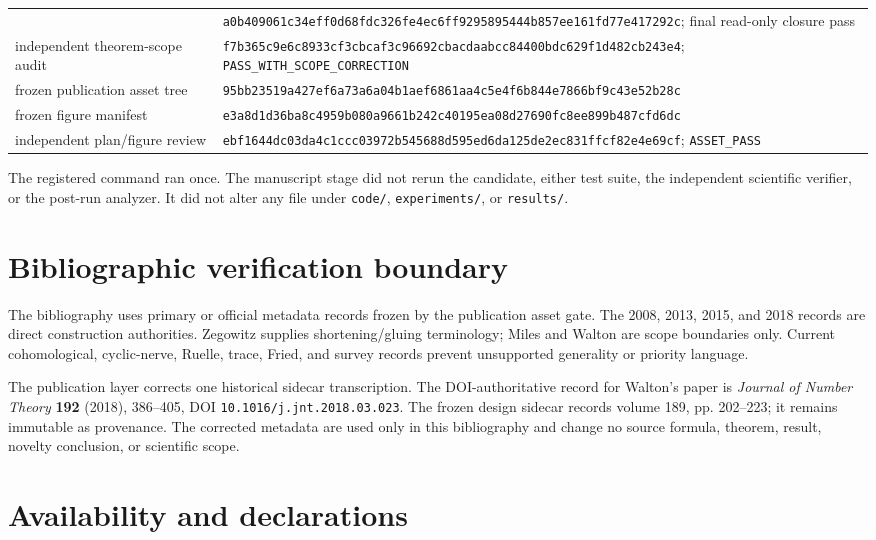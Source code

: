 \documentclass[11pt]{article}
\theoremstyle{definition}
\theoremstyle{remark}
\begin{document}
\begin{longtable}{@{}p{}p{}@{}}
    & \nolinkurl{a0b409061c34eff0d68fdc326fe4ec6ff9295895444b857ee161fd77e417292c};
      final read-only closure pass \\
  independent theorem-scope audit
    & \nolinkurl{f7b365c9e6c8933cf3cbcaf3c96692cbacdaabcc84400bdc629f1d482cb243e4};
      \texttt{PASS\_WITH\_SCOPE\_CORRECTION} \\
  frozen publication asset tree
    & \nolinkurl{95bb23519a427ef6a73a6a04b1aef6861aa4c5e4f6b844e7866bf9c43e52b28c} \\
  frozen figure manifest
    & \nolinkurl{e3a8d1d36ba8c4959b080a9661b242c40195ea08d27690fc8ee899b487cfd6dc} \\
  independent plan/figure review
    & \nolinkurl{ebf1644dc03da4c1ccc03972b545688d595ed6da125de2ec831ffcf82e4e69cf};
      \texttt{ASSET\_PASS} \\
  \bottomrule
\end{longtable}

The registered command ran once.  The manuscript stage did not rerun the
candidate, either test suite, the independent scientific verifier, or the
post-run analyzer.  It did not alter any file under \texttt{code/},
\texttt{experiments/}, or \texttt{results/}.

\section{Bibliographic verification boundary}
\label{app:bibliography-boundary}

The bibliography uses primary or official metadata records frozen by the
publication asset gate.  The 2008, 2013, 2015, and 2018 records are direct
construction authorities.  Zegowitz supplies shortening/gluing terminology;
Miles and Walton are scope boundaries only.  Current cohomological,
cyclic-nerve, Ruelle, trace, Fried, and survey records prevent unsupported
generality or priority language.

The publication layer corrects one historical sidecar transcription.  The
DOI-authoritative record for Walton's paper is \emph{Journal of Number
Theory} \textbf{192} (2018), 386--405, DOI
\nolinkurl{10.1016/j.jnt.2018.03.023}.  The frozen design sidecar records
volume 189, pp. 202--223; it remains immutable as provenance.  The corrected
metadata are used only in this bibliography and change no source formula,
theorem, result, novelty conclusion, or scientific scope.

\section*{Availability and declarations}
\end{document}
